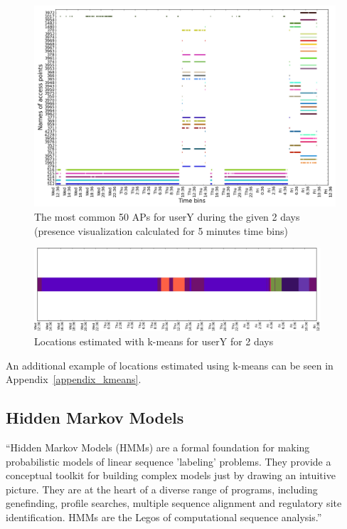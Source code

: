 \begin{figure}[!h]
\centering
\includegraphics[width=\textwidth]{figures/kmeans/user_3_sorted_2days_no_rssi_plot.png}
\caption{The most common 50 APs for userY during the given 2 days (presence
visualization calculated for 5 minutes time bins)}
\label{user_3_days1_2_APs_presence}
\end{figure}

\begin{figure}[!h]
\centering
\includegraphics[width=0.95\textwidth]{figures/kmeans/kmeans_locations_(6)_2days_plot.png}
\caption{Locations estimated with k-means for userY for 2 days}
\label{user_3_days1_2_kmeans}
\end{figure}

An additional example of locations estimated using k-means can be seen in
Appendix~\ref{appendix_kmeans}.

\subsection{Hidden Markov Models}

``Hidden Markov Models (HMMs) are a formal foundation for making probabilistic
models of linear sequence 'labeling' problems. They provide a conceptual
toolkit for building complex models just by drawing an intuitive picture. They
are at the heart of a diverse range of programs, including genefinding, profile
searches, multiple sequence alignment and regulatory site identification. HMMs
are the Legos of computational sequence analysis.''\cite{JOUR} 

